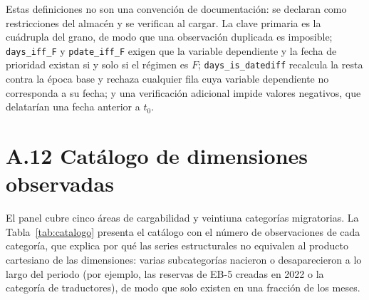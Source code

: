 \documentclass[12pt,letterpaper]{report}
\begin{document}
Estas definiciones no son una convención de documentación: se declaran como restricciones
del almacén y se verifican al cargar. La clave primaria es la cuádrupla del grano, de modo
que una observación duplicada es imposible; \texttt{days\_iff\_F} y \texttt{pdate\_iff\_F}
exigen que la variable dependiente y la fecha de prioridad existan si y solo si el régimen
es $F$; \texttt{days\_is\_datediff} recalcula la resta contra la época base y rechaza
cualquier fila cuya variable dependiente no corresponda a su fecha; y una verificación
adicional impide valores negativos, que delatarían una fecha anterior a $t_0$.

\section{A.12 Catálogo de dimensiones observadas}

El panel cubre cinco áreas de cargabilidad y veintiuna categorías migratorias. La
Tabla~\ref{tab:catalogo} presenta el catálogo con el número de observaciones de cada
categoría, que explica por qué las \factNSeriesStructural{} series estructurales no
equivalen al producto cartesiano de las dimensiones: varias subcategorías nacieron o
desaparecieron a lo largo del periodo (por ejemplo, las reservas de EB-5 creadas en 2022 o
la categoría de traductores), de modo que solo existen en una fracción de los meses.
\end{document}
